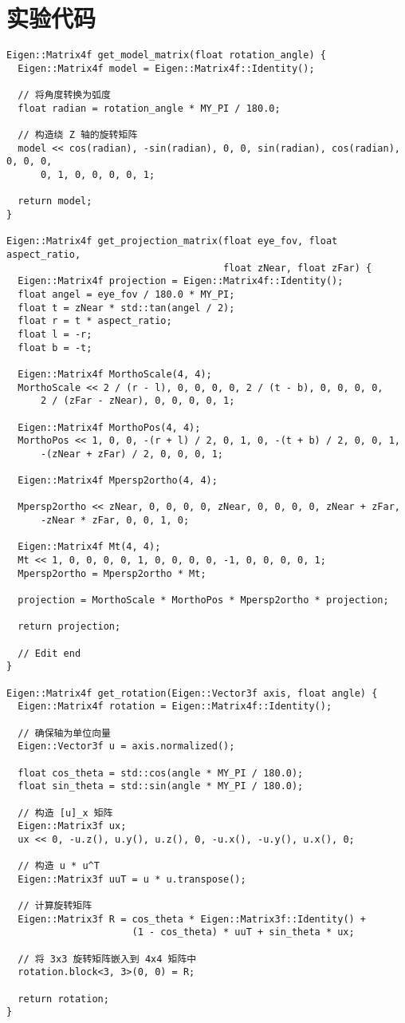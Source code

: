 \documentclass[a4paper,12pt]{article}
\begin{document}
\section{实验代码}
\begin{verbatim}
Eigen::Matrix4f get_model_matrix(float rotation_angle) {
  Eigen::Matrix4f model = Eigen::Matrix4f::Identity();

  // 将角度转换为弧度
  float radian = rotation_angle * MY_PI / 180.0;

  // 构造绕 Z 轴的旋转矩阵
  model << cos(radian), -sin(radian), 0, 0, sin(radian), cos(radian), 0, 0, 0,
      0, 1, 0, 0, 0, 0, 1;

  return model;
}

Eigen::Matrix4f get_projection_matrix(float eye_fov, float aspect_ratio,
                                      float zNear, float zFar) {
  Eigen::Matrix4f projection = Eigen::Matrix4f::Identity();
  float angel = eye_fov / 180.0 * MY_PI;
  float t = zNear * std::tan(angel / 2);
  float r = t * aspect_ratio;
  float l = -r;
  float b = -t;

  Eigen::Matrix4f MorthoScale(4, 4);
  MorthoScale << 2 / (r - l), 0, 0, 0, 0, 2 / (t - b), 0, 0, 0, 0,
      2 / (zFar - zNear), 0, 0, 0, 0, 1;

  Eigen::Matrix4f MorthoPos(4, 4);
  MorthoPos << 1, 0, 0, -(r + l) / 2, 0, 1, 0, -(t + b) / 2, 0, 0, 1,
      -(zNear + zFar) / 2, 0, 0, 0, 1;

  Eigen::Matrix4f Mpersp2ortho(4, 4);

  Mpersp2ortho << zNear, 0, 0, 0, 0, zNear, 0, 0, 0, 0, zNear + zFar,
      -zNear * zFar, 0, 0, 1, 0;

  Eigen::Matrix4f Mt(4, 4);
  Mt << 1, 0, 0, 0, 0, 1, 0, 0, 0, 0, -1, 0, 0, 0, 0, 1;
  Mpersp2ortho = Mpersp2ortho * Mt;

  projection = MorthoScale * MorthoPos * Mpersp2ortho * projection;

  return projection;

  // Edit end
}

Eigen::Matrix4f get_rotation(Eigen::Vector3f axis, float angle) {
  Eigen::Matrix4f rotation = Eigen::Matrix4f::Identity();

  // 确保轴为单位向量
  Eigen::Vector3f u = axis.normalized();

  float cos_theta = std::cos(angle * MY_PI / 180.0);
  float sin_theta = std::sin(angle * MY_PI / 180.0);

  // 构造 [u]_x 矩阵
  Eigen::Matrix3f ux;
  ux << 0, -u.z(), u.y(), u.z(), 0, -u.x(), -u.y(), u.x(), 0;

  // 构造 u * u^T
  Eigen::Matrix3f uuT = u * u.transpose();

  // 计算旋转矩阵
  Eigen::Matrix3f R = cos_theta * Eigen::Matrix3f::Identity() +
                      (1 - cos_theta) * uuT + sin_theta * ux;

  // 将 3x3 旋转矩阵嵌入到 4x4 矩阵中
  rotation.block<3, 3>(0, 0) = R;

  return rotation;
}
\end{verbatim}
\end{document}
